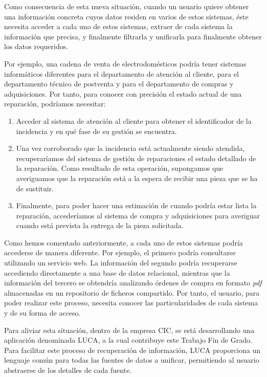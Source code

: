 Como consecuencia de esta nueva situación, cuando un usuario quiere obtener una información concreta cuyos datos residen en varios de estos sistemas, éste necesita acceder a cada uno de estos sistemas, extraer de cada sistema la información que precisa, y finalmente filtrarla y unificarla para finalmente obtener los datos requeridos.

Por ejemplo, una cadena de venta de electrodomésticos podría tener sistemas informáticos diferentes para el departamento de atención al cliente, para el departamento técnico de postventa y para el departamento de compras y adquisiciones. Por tanto, para conocer con precisión el estado actual de una reparación, podríamos necesitar:

\begin{enumerate}
	\item Acceder al sistema de atención al cliente para obtener el identificador de la incidencia y en qué fase de su gestión se encuentra.
	\item Una vez corroborado que la incidencia está actualmente siendo atendida, recuperaríamos del sistema de gestión de reparaciones el estado detallado de la reparación. Como resultado de esta operación, supongamos que averiguamos que la reparación está a la espera de recibir una pieza que se ha de sustituir.
	\item Finalmente, para poder hacer una estimación de cuando podría estar lista la reparación, accederíamos al sistema de compra y adquisiciones para averiguar cuando está prevista la entrega de la pieza solicitada.
\end{enumerate}

Como hemos comentado anteriormente, a cada uno de estos sistemas podría accederse de manera diferente. Por ejemplo, el primero podría consultarse utilizando un servicio web. La información del segundo podría recuperarse accediendo directamente a una base de datos relacional, mientras que la información del tercero se obtendría analizando órdenes de compra en formato \emph{pdf} almacenadas en un repositorio de ficheros compartido. Por tanto, el usuario, para poder realizar este proceso, necesita conocer las particularidades de cada sistema y de su forma de acceso.

Para aliviar esta situación, dentro de la empresa CIC, se está desarrollando una aplicación denominada LUCA, a la cual contribuye este Trabajo Fin de Grado. Para facilitar este proceso de recuperación de información, LUCA proporciona un lenguaje común para todas las fuentes de datos a unificar, permitiendo al usuario abstraerse de los detalles de cada fuente.

